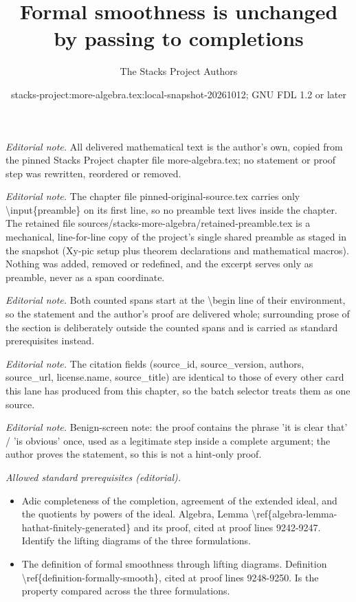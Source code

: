 \documentclass[10pt,a4paper]{amsart}
\title{Formal smoothness is unchanged by passing to completions}
\author{The Stacks Project Authors}
\date{stacks-project:more-algebra.tex:local-snapshot-20261012; GNU FDL 1.2 or later}
\theoremstyle{plain}
\theoremstyle{definition}
\theoremstyle{remark}
\numberwithin{equation}{subsection}
\begin{document}
\maketitle
\setcounter{subsection}{1}
\noindent\textit{Editorial note.} All delivered mathematical text is the author's own, copied from the pinned Stacks Project chapter file more-algebra.tex; no statement or proof step was rewritten, reordered or removed.\par\medskip
\noindent\textit{Editorial note.} The chapter file pinned-original-source.tex carries only \textbackslash{}input\{preamble\} on its first line, so no preamble text lives inside the chapter. The retained file sources/stacks-more-algebra/retained-preamble.tex is a mechanical, line-for-line copy of the project's single shared preamble as staged in the snapshot (Xy-pic setup plus theorem declarations and mathematical macros). Nothing was added, removed or redefined, and the excerpt serves only as preamble, never as a span coordinate.\par\medskip
\noindent\textit{Editorial note.} Both counted spans start at the \textbackslash{}begin line of their environment, so the statement and the author's proof are delivered whole; surrounding prose of the section is deliberately outside the counted spans and is carried as standard prerequisites instead.\par\medskip
\noindent\textit{Editorial note.} The citation fields (source\_id, source\_version, authors, source\_url, license.name, source\_title) are identical to those of every other card this lane has produced from this chapter, so the batch selector treats them as one source.\par\medskip
\noindent\textit{Editorial note.} Benign-screen note: the proof contains the phrase 'it is clear that' / 'is obvious' once, used as a legitimate step inside a complete argument; the author proves the statement, so this is not a hint-only proof.\par\medskip
\noindent\textit{Allowed standard prerequisites (editorial).}\begin{itemize}
\item Adic completeness of the completion, agreement of the extended ideal, and the quotients by powers of the ideal. Algebra, Lemma \textbackslash{}ref\{algebra-lemma-hathat-finitely-generated\} and its proof, cited at proof lines 9242-9247. Identify the lifting diagrams of the three formulations.
\item The definition of formal smoothness through lifting diagrams. Definition \textbackslash{}ref\{definition-formally-smooth\}, cited at proof lines 9248-9250. Is the property compared across the three formulations.
\end{itemize}\medskip
\end{document}
